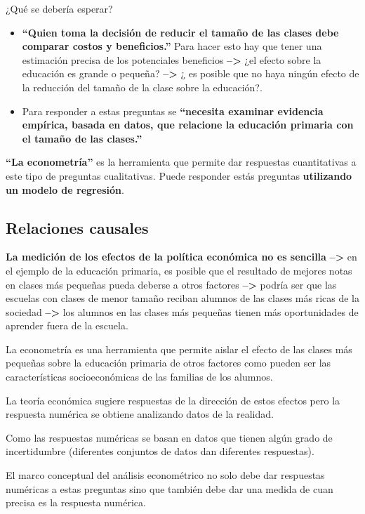 \documentclass[
]{book}
\begin{document}
¿Qué se debería esperar?

\begin{itemize}
\item
  \textbf{``Quien toma la decisión de reducir el tamaño de las clases debe comparar costos y beneficios.''} Para hacer esto hay que tener una estimación precisa de los potenciales beneficios \textbf{--\textgreater{}} ¿el efecto sobre la educación es grande o pequeña? \textbf{--\textgreater{}} ¿ es posible que no haya ningún efecto de la reducción del tamaño de la clase sobre la educación?.
\item
  Para responder a estas preguntas se \textbf{``necesita examinar evidencia empírica, basada en datos, que relacione la educación primaria con el tamaño de las clases.''}
\end{itemize}

\textbf{``La econometría''} es la herramienta que permite dar respuestas cuantitativas a este tipo de preguntas cualitativas. Puede responder estás preguntas \textbf{utilizando un modelo de regresión}.

\hypertarget{relaciones-causales}{%
\subsection{Relaciones causales}\label{relaciones-causales}}

\textbf{La medición de los efectos de la política económica no es sencilla} \textbf{--\textgreater{}} en el ejemplo de la educación primaria, es posible que el resultado de mejores notas en clases más pequeñas pueda deberse a otros factores \textbf{--\textgreater{}} podría ser que las escuelas con clases de menor tamaño reciban alumnos de las clases más ricas de la sociedad \textbf{--\textgreater{}} los alumnos en las clases más pequeñas tienen más oportunidades de aprender fuera de la escuela.

La econometría es una herramienta que permite aislar el efecto de las clases más pequeñas sobre la educación primaria de otros factores como pueden ser las características socioeconómicas de las familias de los alumnos.

La teoría económica sugiere respuestas de la dirección de estos efectos pero la respuesta numérica se obtiene analizando datos de la realidad.

Como las respuestas numéricas se basan en datos que tienen algún grado de incertidumbre (diferentes conjuntos de datos dan diferentes respuestas).

El marco conceptual del análisis econométrico no solo debe dar respuestas numéricas a estas preguntas sino que también debe dar una medida de cuan precisa es la respuesta numérica.
\end{document}
